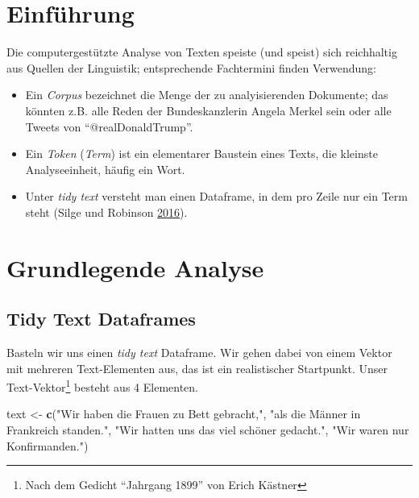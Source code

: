 \documentclass[12pt,ngerman,]{book}
\makeatletter
\newenvironment{Shaded}{\begin{snugshade}}{\end{snugshade}}
\newcommand{\KeywordTok}[1]{\textcolor[rgb]{0.13,0.29,0.53}{\textbf{{#1}}}}
\newcommand{\StringTok}[1]{\textcolor[rgb]{0.31,0.60,0.02}{{#1}}}
\newcommand{\NormalTok}[1]{{#1}}
\let\rmarkdownfootnote\footnote%
\def\footnote{\protect\rmarkdownfootnote}
\newenvironment{kframe}{%
\medskip{}
\setlength{\fboxsep}{.8em}
 \def\at@end@of@kframe{}%
 \ifinner\ifhmode%
  \def\at@end@of@kframe{\end{minipage}}%
  \begin{minipage}{\columnwidth}%
 \fi\fi%
 \def\FrameCommand##1{\hskip\@totalleftmargin \hskip-\fboxsep
 \colorbox{shadecolor}{##1}\hskip-\fboxsep
     \hskip-\linewidth \hskip-\@totalleftmargin \hskip\columnwidth}%
 \MakeFramed {\advance\hsize-\width
   \@totalleftmargin\z@ \linewidth\hsize
   \@setminipage}}%
 {\par\unskip\endMakeFramed%
 \at@end@of@kframe}
\renewenvironment{Shaded}{\begin{kframe}}{\end{kframe}}
\makeatother
\begin{document}
\section{Einführung}\label{einfuhrung-1}

Die computergestützte Analyse von Texten speiste (und speist) sich
reichhaltig aus Quellen der Linguistik; entsprechende Fachtermini finden
Verwendung:

\begin{itemize}
\item
  Ein \emph{Corpus} bezeichnet die Menge der zu analyisierenden
  Dokumente; das könnten z.B. alle Reden der Bundeskanzlerin Angela
  Merkel sein oder alle Tweets von ``@realDonaldTrump''.
\item
  Ein \emph{Token} (\emph{Term}) ist ein elementarer Baustein eines
  Texts, die kleinste Analyseeinheit, häufig ein Wort.
\item
  Unter \emph{tidy text} versteht man einen Dataframe, in dem pro Zeile
  nur ein Term steht (Silge und Robinson
  \protect\hyperlink{ref-Silge2016}{2016}).
\end{itemize}

\section{Grundlegende Analyse}\label{grundlegende-analyse}

\subsection{Tidy Text Dataframes}\label{tidy-text-dataframes}

Basteln wir uns einen \emph{tidy text} Dataframe. Wir gehen dabei von
einem Vektor mit mehreren Text-Elementen aus, das ist ein realistischer
Startpunkt. Unser Text-Vektor\footnote{Nach dem Gedicht ``Jahrgang
  1899'' von Erich Kästner} besteht aus 4 Elementen.

\begin{Shaded}
\begin{Highlighting}[]
\NormalTok{text <-}\StringTok{ }\KeywordTok{c}\NormalTok{(}\StringTok{"Wir haben die Frauen zu Bett gebracht,"}\NormalTok{,}
          \StringTok{"als die Männer in Frankreich standen."}\NormalTok{,}
          \StringTok{"Wir hatten uns das viel schöner gedacht."}\NormalTok{,}
          \StringTok{"Wir waren nur Konfirmanden."}\NormalTok{)}
\end{Highlighting}
\end{Shaded}
\end{document}

